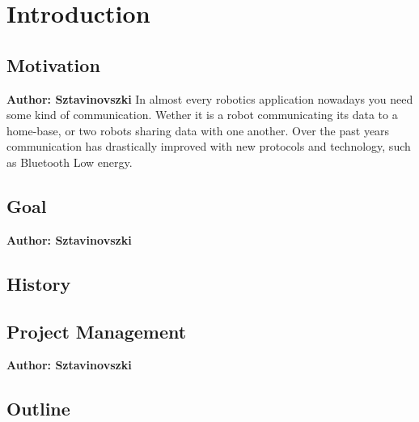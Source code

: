 \chapter{Introduction}


\vspace{2mm}

\section{Motivation}
\textbf{Author: Sztavinovszki}
In almost every robotics application nowadays you need some kind of communication. Wether it is a robot communicating
its data to a home-base, or two robots sharing data with one another. Over the past years communication has drastically
improved with new protocols and technology, such as Bluetooth Low energy.

\section{Goal}
\textbf{Author: Sztavinovszki}

\section{History}

\section{Project Management}
\textbf{Author: Sztavinovszki}

\section{Outline}




